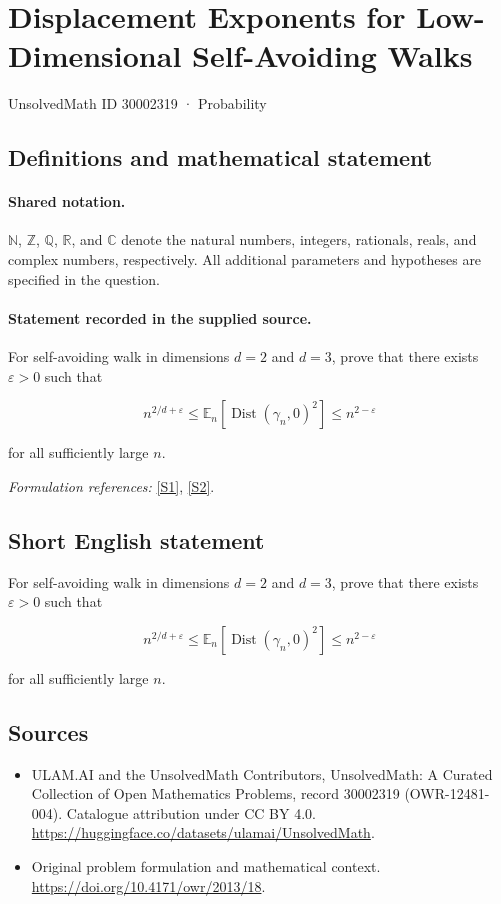 \documentclass[11pt]{article}
\newcommand{\sref}[2]{\hyperlink{source:#1:#2}{[S#2]}}
\begin{document}
\setcounter{section}{30002318}
\section{Displacement Exponents for Low-Dimensional Self-Avoiding Walks}\label{30002319}
{\small UnsolvedMath ID 30002319 · Probability}
\subsection{Definitions and mathematical statement}

\paragraph{Shared notation.}$\mathbb N$, $\mathbb Z$, $\mathbb Q$, $\mathbb R$, and $\mathbb C$ denote the natural numbers, integers, rationals, reals, and complex numbers, respectively. All additional parameters and hypotheses are specified in the question.


\paragraph{Statement recorded in the supplied source.}
For self-avoiding walk in dimensions $d=2$ and $d=3$, prove that there exists $\varepsilon>0$ such that

$$n^{2/d+\varepsilon}\leq \mathbb E_n[\operatorname{Dist}(\gamma_n,0)^2]\leq n^{2-\varepsilon}$$

for all sufficiently large $n$.
\par\smallskip\textit{Formulation references:} \sref{30002319}{1}, \sref{30002319}{2}.
\subsection{Short English statement}
For self-avoiding walk in dimensions $d=2$ and $d=3$, prove that there exists $\varepsilon>0$ such that

$$n^{2/d+\varepsilon}\leq \mathbb E_n[\operatorname{Dist}(\gamma_n,0)^2]\leq n^{2-\varepsilon}$$

for all sufficiently large $n$.
\subsection{Sources}
\begin{itemize}
\item[\hypertarget{source:30002319:1}{S1}] ULAM.AI and the UnsolvedMath Contributors, UnsolvedMath: A Curated Collection of Open Mathematics Problems, record 30002319 (OWR-12481-004). Catalogue attribution under CC BY 4.0.
\url{https://huggingface.co/datasets/ulamai/UnsolvedMath}.
\item[\hypertarget{source:30002319:2}{S2}] Original problem formulation and mathematical context.
\url{https://doi.org/10.4171/owr/2013/18}.
\end{itemize}
\label{end:30002319}
\end{document}
